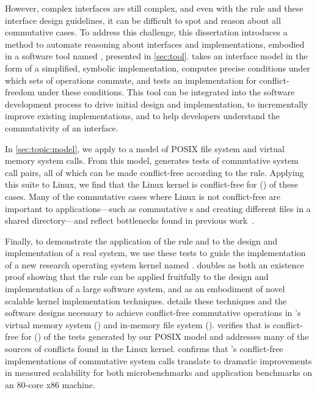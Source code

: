 However, complex interfaces are still complex, and even with the rule
and these interface design guidelines, it can be difficult to spot and
reason about all commutative cases.
%
%
To address this challenge, this dissertation introduces a method to
automate reasoning about interfaces and implementations, embodied in a
software tool named \tool, presented in \cref{sec:tool}.
%
\tool takes an interface model
in the form of a simplified, symbolic implementation, computes precise
conditions under which sets of operations commute, and tests an
implementation for conflict-freedom under these conditions.  This tool can be
integrated into the software development process to drive initial design and
implementation, to incrementally improve existing implementations, and to
help developers understand the commutativity of an interface.

In \cref{sec:topic:model}, we apply \tool to a model of
 POSIX file system and virtual memory system
calls.
%
From this model,
\tool generates  tests of commutative
system call pairs, all of which can be made conflict-free
according to the rule.
%
Applying this suite to Linux, we find that the Linux kernel is
conflict-free for 
() of
these cases.
%
Many of the commutative cases where Linux is not conflict-free are
important to applications---such as commutative
s and creating different files in a shared directory---and
reflect bottlenecks found in previous
work~\cite{boyd-wickizer:scaling}.

Finally, to demonstrate the application of the rule and \tool to the
design and implementation of a real system, we use these tests to
guide the implementation of a new research operating system kernel
named \sys.
%
\sys doubles as both an existence proof showing that the rule can be
applied fruitfully to the design and implementation of a large
software system, and as an embodiment of novel scalable kernel
implementation techniques.
%
 details these techniques and the software designs
necessary to achieve conflict-free commutative operations in \sys's
virtual memory system (\vm) and in-memory file system (\fs).
%
\tool verifies that \sys is conflict-free for
()
of the tests generated by our POSIX model and addresses many of the
sources of conflicts found in the Linux kernel.
%
 confirms that \sys's conflict-free implementations of
commutative system calls translate to dramatic improvements in
measured scalability for both microbenchmarks and application
benchmarks on an 80-core x86 machine.


